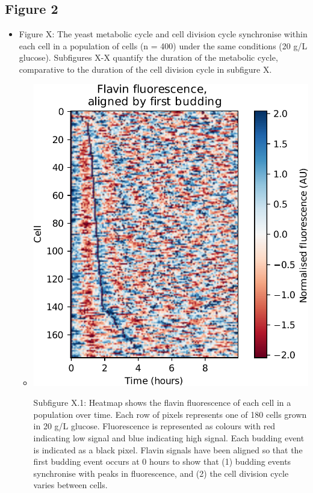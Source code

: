 \subsection{Figure 2}
\label{sec:orga6d8d36}
\begin{itemize}
\item Figure X: The yeast metabolic cycle and cell division cycle synchronise within each cell in a population of cells (n = 400) under the same conditions (20 g/L glucose).  Subfigures X-X quantify the duration of the metabolic cycle, comparative to the duration of the cell division cycle in subfigure X.

\begin{itemize}
\item \begin{center}
\includegraphics[width=.9\linewidth]{heatmap_edit.pdf}
\end{center} Subfigure X.1: Heatmap shows the flavin fluorescence of each cell in a population over time.  Each row of pixels represents one of 180 cells grown in 20 g/L glucose.  Fluorescence is represented as colours with red indicating low signal and blue indicating high signal.  Each budding event is indicated as a black pixel.  Flavin signals have been aligned so that the first budding event occurs at 0 hours to show that (1) budding events synchronise with peaks in fluorescence, and (2) the cell division cycle varies between cells.

\end{itemize}
\end{itemize}
